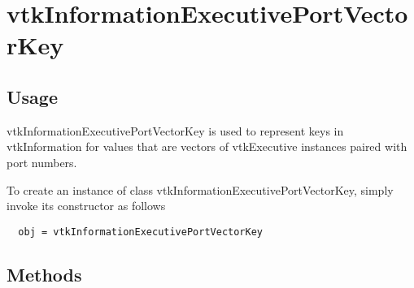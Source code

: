 \section{vtkInformationExecutivePortVectorKey}

\subsection{Usage}

 vtkInformationExecutivePortVectorKey is used to represent keys in
 vtkInformation for values that are vectors of vtkExecutive
 instances paired with port numbers.

To create an instance of class vtkInformationExecutivePortVectorKey, simply
invoke its constructor as follows
\begin{verbatim}
  obj = vtkInformationExecutivePortVectorKey
\end{verbatim}
\subsection{Methods}

